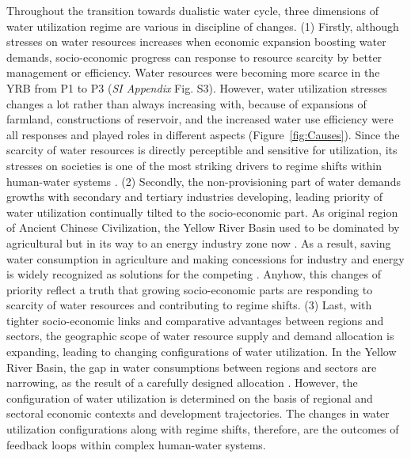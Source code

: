 \documentclass[9pt, twocolumn, twoside, lineno]{pnas-new}
\begin{document}
Throughout the transition towards dualistic water cycle, three dimensions of water utilization regime are various in discipline of changes. 
(1) Firstly, although stresses on water resources increases when economic expansion boosting water demands, socio-economic progress can response to resource scarcity by better management or efficiency. Water resources were becoming more scarce in the YRB from P1 to P3 (\textit{SI Appendix} Fig. S3). However, water utilization stresses changes a lot rather than always increasing with, because of expansions of farmland, constructions of reservoir, and the increased water use efficiency were all responses and played roles in different aspects (Figure~\ref{fig:Causes}). Since the scarcity of water resources is directly perceptible and sensitive for utilization, its stresses on societies is one of the most striking drivers to regime shifts within human-water systems \cite{qinFlexibilityIntensityGlobal2019}.
(2) Secondly, the non-provisioning part of water demands growths with secondary and tertiary industries developing, leading priority of water utilization continually tilted to the socio-economic part. As original region of Ancient Chinese Civilization, the Yellow River Basin used to be dominated by agricultural but in its way to an energy industry zone now \cite{WillEnergyBases}. As a result, saving water consumption in agriculture and making concessions for industry and energy is widely recognized as solutions for the competing \cite{xiangWillEnergyIndustry2016,bebbWaterRightsTransfers2011}. Anyhow, this changes of priority reflect a truth that growing socio-economic parts are responding to scarcity of water resources and contributing to regime shifts.
(3) Last, with tighter socio-economic links and comparative advantages between regions and sectors, the geographic scope of water resource supply and demand allocation is expanding, leading to changing configurations of water utilization. In the Yellow River Basin, the gap in water consumptions between regions and sectors are narrowing, as the result of a carefully designed allocation \cite{wangThirtyYearsYellow2018}. However, the configuration of water utilization is determined on the basis of regional and sectoral economic contexts and development trajectories\cite{wangThirtyYearsYellow2018}. The changes in water utilization configurations along with regime shifts, therefore, are the outcomes of feedback loops within complex human-water systems.
\end{document}
